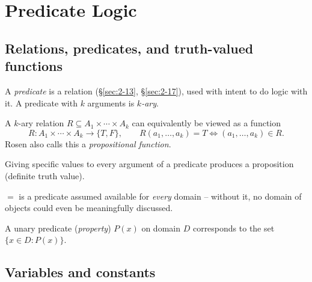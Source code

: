 \newpage
\section{Predicate Logic}

\subsection{Relations, predicates, and truth-valued functions}
\label{sec:5-1}

\begin{definition}[Predicate]
A \emph{predicate} is a relation (\S\ref{sec:2-13}, \S\ref{sec:2-17}), used with intent to do logic with it. A predicate with $k$ arguments is \emph{$k$-ary}.
\end{definition}

\begin{definition}
A $k$-ary relation $R \subseteq A_1\times\cdots\times A_k$ can equivalently be viewed as a function
\[
R : A_1\times\cdots\times A_k \to \{T,F\}, \qquad R(a_1,\dots,a_k) = T \iff (a_1,\dots,a_k)\in R.
\]
Rosen also calls this a \emph{propositional function}.
\end{definition}

\begin{note}
Giving specific values to every argument of a predicate produces a proposition (definite truth value).
\end{note}

\begin{note}
$=$ is a predicate assumed available for \emph{every} domain -- without it, no domain of objects could even be meaningfully discussed.
\end{note}

\begin{definition}[Property]
A unary predicate (\emph{property}) $P(x)$ on domain $D$ corresponds to the set $\{x\in D : P(x)\}$.
\end{definition}

\subsection{Variables and constants}
\label{sec:5-2}


